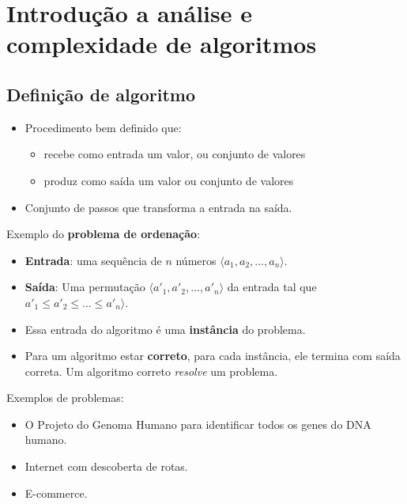 \section{Introdução a análise e complexidade de algoritmos}

\subsection{Definição de algoritmo}

\begin{itemize}
\item Procedimento bem definido que:
	\begin{itemize}
	\item recebe como entrada um valor, ou conjunto de valores
	\item produz como saída um valor ou conjunto de valores
	\end{itemize}
\item Conjunto de passos que transforma a entrada na saída.
\end{itemize}

Exemplo do {\bf problema de ordenação}:
\begin{itemize}
\item {\bf Entrada}: uma sequência de $n$ números $\langle a_1, a_2, ..., a_n \rangle$.

\item {\bf Saída}:  Uma permutação $\langle {a'}_1, {a'}_2, ..., {a'}_n \rangle$ da
entrada tal que ${a'}_1 \leq {a'}_2 \leq ... \leq {a'}_n \rangle$.
\end{itemize}

\begin{itemize}
\item Essa entrada do algoritmo é uma {\bf instância} do problema.
\item Para um algoritmo estar {\bf correto}, para cada instância, ele termina com saída 
correta. Um algoritmo correto \textit{resolve} um problema. 
\end{itemize}

Exemplos de problemas:
\begin{itemize}
\item O Projeto do Genoma Humano para identificar todos os genes do DNA humano.
\item Internet com descoberta de rotas.
\item E-commerce.
\end{itemize}

